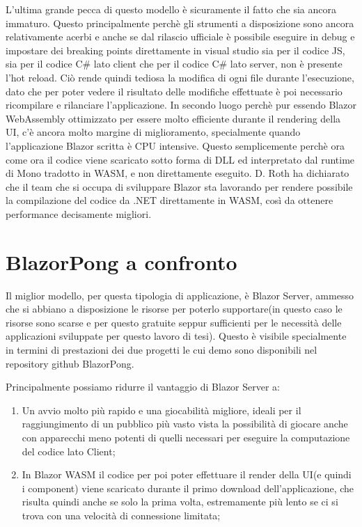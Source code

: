 L'ultima grande pecca di questo modello \`e sicuramente il fatto che sia ancora immaturo.
Questo principalmente perch\`e gli strumenti a disposizione sono ancora relativamente acerbi e anche se dal rilascio ufficiale \`e possibile eseguire in debug e impostare dei breaking points direttamente in visual studio sia per il codice JS, sia per il codice C\# lato client che per il codice C\# lato server, non \`e presente l'hot reload.
Ci\`o rende quindi tediosa la modifica di ogni file durante l'esecuzione, dato che per poter vedere il risultato delle modifiche effettuate \`e poi necessario ricompilare e rilanciare l'applicazione.
In secondo luogo perch\`e pur essendo Blazor WebAssembly ottimizzato per essere molto efficiente durante il rendering della UI, c'\`e ancora molto margine di miglioramento, specialmente quando l'applicazione Blazor scritta \`e CPU intensive.
Questo semplicemente perch\`e ora come ora il codice viene scaricato sotto forma di DLL ed interpretato dal runtime di Mono tradotto in WASM, e non direttamente eseguito.
D. Roth ha dichiarato che il team che si occupa di sviluppare Blazor sta lavorando per rendere possibile la compilazione del codice da .NET direttamente in WASM, cos\`i da ottenere performance decisamente migliori\cite{blazorModelsScenarios}.

\section{BlazorPong a confronto}\label{sez:scalabilitaBWA}
Il miglior modello, per questa tipologia di applicazione, \`e Blazor Server, ammesso che si abbiano a disposizione le risorse per poterlo supportare(in questo caso le risorse sono scarse e per questo gratuite seppur sufficienti per le necessit\`a delle applicazioni sviluppate per questo lavoro di tesi).
Questo \`e visibile specialmente in termini di prestazioni dei due progetti le cui demo sono disponibili nel repository github BlazorPong.

Principalmente possiamo ridurre il vantaggio di Blazor Server a:
\begin{enumerate}
	\item Un avvio molto pi\`u rapido e una giocabilit\`a migliore, ideali per il raggiungimento di un pubblico pi\`u vasto vista la possibilit\`a di giocare anche con apparecchi meno potenti di quelli necessari per eseguire la computazione del codice lato Client;
	\item In Blazor WASM il codice per poi poter effettuare il render della UI(e quindi i component) viene scaricato durante il primo download dell'applicazione, che risulta quindi anche se solo la prima volta, estremamente pi\`u lento se ci si trova con una velocit\`a di connessione limitata;
\end{enumerate}

